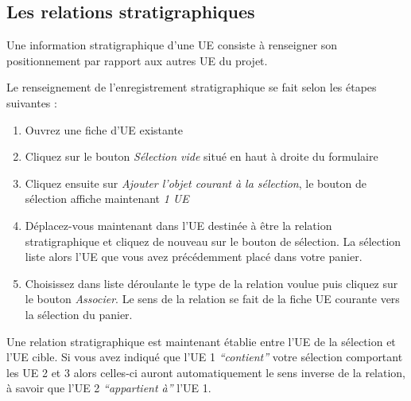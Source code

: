 \documentclass[letterpaper,10pt,french]{sphinxmanual}
\begin{document}
\subsection{Les relations stratigraphiques}
\label{manuel/formulaire_ue:les-relations-stratigraphiques}
Une information stratigraphique d'une UE consiste à renseigner son positionnement par rapport aux autres UE du projet.

Le renseignement de l'enregistrement stratigraphique se fait selon les étapes suivantes :
\begin{enumerate}
\item {} 
Ouvrez une fiche d'UE existante

\item {} 
Cliquez sur le bouton \emph{Sélection vide} situé en haut à droite du formulaire

\item {} 
Cliquez ensuite sur \emph{Ajouter l’objet courant à la sélection}, le bouton de sélection affiche maintenant \emph{1 UE}

\item {} 
Déplacez-vous maintenant dans l'UE destinée à être la relation stratigraphique et cliquez de nouveau sur le bouton de sélection. La sélection liste alors l'UE que vous avez précédemment placé dans votre panier.

\item {} 
Choisissez dans liste déroulante le type de la relation voulue puis cliquez sur le bouton \emph{Associer}. Le sens de la relation se fait de la fiche UE courante vers la sélection du panier.

\end{enumerate}

Une relation stratigraphique est maintenant établie entre l'UE de la sélection et l'UE cible. Si vous avez indiqué que l'UE 1 \emph{``contient''} votre sélection comportant les UE 2 et 3 alors celles-ci auront automatiquement le sens inverse de la relation, à savoir que l'UE 2 \emph{``appartient à''} l'UE 1.
\begin{figure}[htbp]
\centering

\end{figure}
\end{document}
